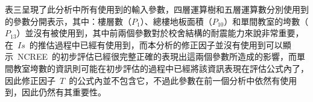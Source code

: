 
表三呈現了此分析中所有使用到的輸入參數，四層運算樹和五層運算數分別使用到的參數分開表示，其中：樓層數（$P_1$）、總樓地板面積（$P_{10}$）和單間教室的垮數（$P_{13}$）並沒有被使用到，其中前兩個參數對於校舍結構的耐震能力來說非常重要，在~$Is$~的推估過程中已經有使用到，而本分析的修正因子並沒有使用到可以顯示~NCREE~的初步評估已經很完整正確的表現出這兩個參數所造成的影響，而單間教室垮數的資訊則可能在初步評估的過程中已經將該資訊表現在評估公式內了，因此修正因子~$T$~的公式內並不包含它，不過此參數在前一個分析中依然有使用到，因此仍然有其重要性。





